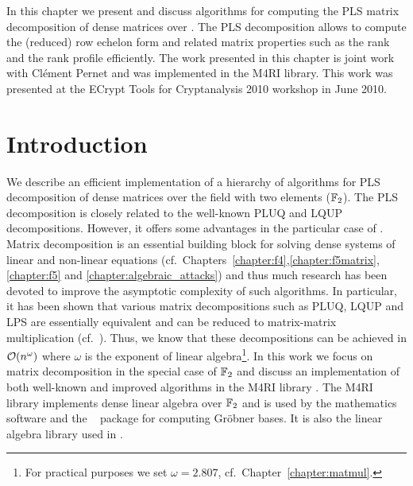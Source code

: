 \newcommand{\addrowsfromtable}{\textsc{AddRowsFromTable}}
\newcommand{\maketable}{\textsc{MakeTable}}
\newcommand{\gausssubmatrix}{\textsc{GaussSubmatrix}}
\newcommand{\plssubmatrix}{\textsc{PlsSubmatrix}}
\newcommand{\submatrix}[1]{\textsc{SubMatrix}(#1)}

\newcommand{\kbar}{\ensuremath{\overline{k}}}

In this chapter we present and discuss algorithms for computing the PLS matrix decomposition of dense matrices over \GFZ. The PLS decomposition allows to compute the (reduced) row echelon form and related matrix properties such as the rank and the rank profile efficiently. The work presented in this chapter is joint work with Clément Pernet \cite{Albrecht2010} and was implemented in the M4RI \cite{M4RI} library. This work was presented at the ECrypt Tools for Cryptanalysis 2010 workshop in June 2010.

\section{Introduction}
We describe an efficient implementation of a hierarchy of algorithms for PLS decomposition of dense matrices over the field with two elements ($\mathbb{F}_2$). The PLS decomposition is closely related to the well-known PLUQ and LQUP decompositions. However, it offers some advantages in the particular case of \GFZ. Matrix decomposition is an essential building block for solving dense systems of linear and non-linear equations (cf.\ Chapters~\ref{chapter:f4},\ref{chapter:f5matrix},\ref{chapter:f5} and \ref{chapter:algebraic_attacks}) and thus much research has been devoted to improve the asymptotic complexity of such algorithms. In particular, it has been shown that various matrix decompositions such as PLUQ, LQUP and LPS are essentially equivalent and can be reduced to matrix-matrix multiplication (cf.~\cite{jeannerod-pernet-storjohann:pluq2010}). Thus, we know that these decompositions can be achieved in $\mathcal{O}\!\left(n^\omega\right)$ where $\omega$ is the exponent of linear algebra\footnote{For practical purposes we set $\omega = 2.807$, cf.\ Chapter~\ref{chapter:matmul}.}. In this work we focus on matrix decomposition in the special case of $\mathbb{F}_2$ and discuss an implementation of both well-known and improved algorithms in the M4RI library \cite{M4RI}. The M4RI library implements dense linear algebra over $\mathbb{F}_2$ and is used by the \Sage \cite{sage} mathematics software and the \PolyBoRi~\cite{polybori} package for computing Gröbner bases. It is also the linear algebra library used in \cite{mxl2,mohamed-cabarcas-ding-buchmann-bulygin:icisc09}.

